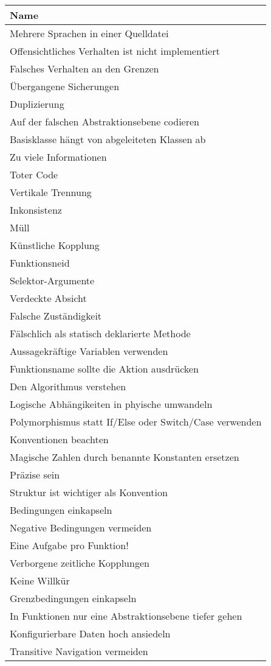 \begin{table}[H]
	\centering
		 \begin{tabular}{ | l | }
		 \hline
			Name \\  \hline
			Mehrere Sprachen in einer Quelldatei \\
			Offensichtliches Verhalten ist nicht implementiert \\
			Falsches Verhalten an den Grenzen \\
			Übergangene Sicherungen \\
			Duplizierung \\
			Auf der falschen Abstraktionsebene codieren \\
			Basisklasse hängt von abgeleiteten Klassen ab \\
			Zu viele Informationen \\
			Toter Code \\
			Vertikale Trennung \\
			Inkonsistenz \\
			Müll \\
			Künstliche Kopplung \\
			Funktionsneid \\
			Selektor-Argumente \\
			Verdeckte Absicht \\
			Falsche Zuständigkeit \\
			Fälschlich als statisch deklarierte Methode \\
			Aussagekräftige Variablen verwenden \\
			Funktionsname sollte die Aktion ausdrücken \\
			Den Algorithmus verstehen \\
			Logische Abhängikeiten in phyische umwandeln \\
			Polymorphismus statt If/Else oder Switch/Case verwenden \\
			Konventionen beachten \\
			Magische Zahlen durch benannte Konstanten ersetzen \\
			Präzise sein \\
			Struktur ist wichtiger als Konvention \\
			Bedingungen einkapseln \\
			Negative Bedingungen vermeiden \\
			Eine Aufgabe pro Funktion! \\
			Verborgene zeitliche Kopplungen \\
			Keine Willkür \\
			Grenzbedingungen einkapseln \\
			In Funktionen nur eine Abstraktionsebene tiefer gehen \\
			Konfigurierbare Daten hoch ansiedeln \\
			Transitive Navigation vermeiden \\ \hline
		\end{tabular}
	\label{tab:SmellsUndHeuristiken_Common}
\end{table}

